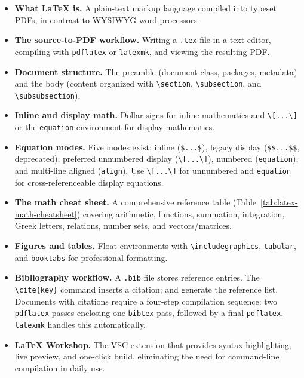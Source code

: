 \begin{itemize}
    \item \textbf{What \LaTeX{} is.} A plain-text markup language
          compiled into typeset PDFs, in contrast to WYSIWYG word
          processors.
    \item \textbf{The source-to-PDF workflow.} Writing a
          \texttt{.tex} file in a text editor, compiling with
          \texttt{pdflatex} or \texttt{latexmk}, and viewing the
          resulting PDF.
    \item \textbf{Document structure.} The preamble (document class,
          packages, metadata) and the body (content organized with
          \verb|\section|, \verb|\subsection|, and
          \verb|\subsubsection|).
    \item \textbf{Inline and display math.} Dollar signs for inline
          mathematics and \verb|\[...\]| or the \texttt{equation}
          environment for display mathematics.
    \item \textbf{Equation modes.} Five modes exist: inline
          (\verb|$...$|), legacy display (\verb|$$...$$|, deprecated),
          preferred unnumbered display (\verb|\[...\]|), numbered
          (\texttt{equation}), and multi-line aligned (\texttt{align}).
          Use \verb|\[...\]| for unnumbered and \texttt{equation} for
          cross-referenceable display equations.
    \item \textbf{The math cheat sheet.} A comprehensive reference
          table (Table~\ref{tab:latex-math-cheatsheet}) covering
          arithmetic, functions, summation, integration, Greek
          letters, relations, number sets, and vectors/matrices.
    \item \textbf{Figures and tables.} Float environments with
          \verb|\includegraphics|, \texttt{tabular}, and
          \texttt{booktabs} for professional formatting.
    \item \textbf{Bibliography workflow.} A \texttt{.bib} file stores
          reference entries. The \verb|\cite{key}| command inserts a
          citation; \verb|| and
          \verb|| generate the reference list.
          Documents with citations require a four-step compilation
          sequence: two \texttt{pdflatex} passes enclosing one
          \texttt{bibtex} pass, followed by a final \texttt{pdflatex}.
          \texttt{latexmk} handles this automatically.
    \item \textbf{LaTeX Workshop.} The VSC extension that provides
          syntax highlighting, live preview, and one-click build,
          eliminating the need for command-line compilation in daily
          use.
\end{itemize}

